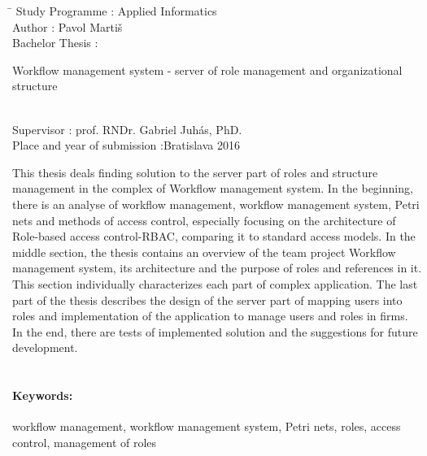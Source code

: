 \documentclass[12pt, oneside]{book}
\def\mfautor{Pavol Martiš}
\begin{document}
\begin{tabbing}	
	\hspace*{7cm}\= \kill
	Study Programme :\> Applied Informatics\\
	Author :\> \mfautor\\
	Bachelor Thesis :\>
	\begin{minipage}[t]{20em}
	Workflow management system - server of role management
	and organizational structure
	\end{minipage} \\
	Supervisor :\> prof. RNDr. Gabriel Juhás, PhD.\\
	
	Place and year of submission :\>Bratislava 2016
\end{tabbing}
This thesis deals finding solution to the server part of roles and structure management
in the complex of Workflow management system.
In the beginning, there is an analyse of workflow management, workflow management system, Petri nets 
and methods of access control, especially focusing on the architecture of Role-based access control-RBAC, comparing it to standard access models. 
In the middle section, the thesis contains an overview of the team project Workflow management system,
its architecture and the purpose of roles and references in it. This section individually characterizes each part of complex application. 
The last part of the thesis describes the design of the server part of 
mapping users into roles and implementation of the application to manage users and roles in firms. 
In the end, there are tests of implemented solution and the suggestions for future development.\\ \\


\paragraph*{Keywords:}  workflow management, workflow management system, Petri nets, roles, access control, management of roles





\end{document}
